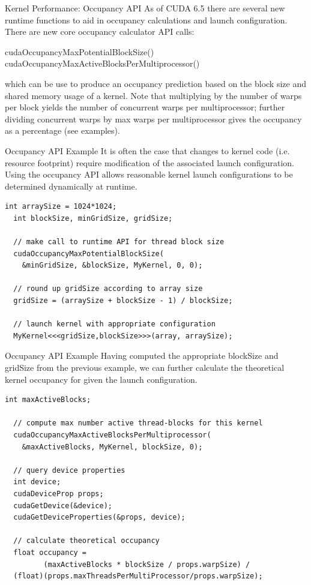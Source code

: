 \documentclass[handout]{beamer}
\begin{document}
\begin{frame}{Kernel Performance: Occupancy API}
As of CUDA 6.5 there are several new runtime functions to aid in occupancy calculations and launch configuration.  There are new core occupancy calculator API calls: \begin{center}
{\selectfont cudaOccupancyMaxPotentialBlockSize()}\break
{\selectfont cudaOccupancyMaxActiveBlocksPerMultiprocessor()}
\end{center}
which can be use to produce an occupancy prediction based on the block size and shared memory usage of a kernel.  
\newline\newline
Note that multiplying by the number of warps per block yields the number of concurrent warps per multiprocessor; further dividing concurrent warps by max warps per multiprocessor gives the occupancy as a percentage (see examples).
\end{frame}

\begin{frame}[fragile]{Occupancy API Example}
It is often the case that changes to kernel code (i.e. resource footprint) require modification of the associated launch configuration.  Using the occupancy API allows reasonable kernel launch configurations to be determined dynamically at runtime.  
\begin{lstlisting}[caption={Use CUDA runtime API to determine kernel lunch configuration}] 
  int arraySize = 1024*1024;
  int blockSize, minGridSize, gridSize;

  // make call to runtime API for thread block size 
  cudaOccupancyMaxPotentialBlockSize(
    &minGridSize, &blockSize, MyKernel, 0, 0);

  // round up gridSize according to array size
  gridSize = (arraySize + blockSize - 1) / blockSize;

  // launch kernel with appropriate configuration
  MyKernel<<<gridSize,blockSize>>>(array, arraySize);
\end{lstlisting}
\end{frame}


\begin{frame}[fragile]{Occupancy API Example}
Having computed the appropriate blockSize and gridSize from the previous example, we can further calculate the theoretical kernel occupancy for given the launch configuration.
\begin{lstlisting}[caption={Use CUDA runtime API to calculate kernel occupancy}] 
  int maxActiveBlocks;
  
  // compute max number active thread-blocks for this kernel
  cudaOccupancyMaxActiveBlocksPerMultiprocessor( 
    &maxActiveBlocks, MyKernel, blockSize, 0);
  
  // query device properties
  int device;
  cudaDeviceProp props;
  cudaGetDevice(&device);
  cudaGetDeviceProperties(&props, device);

  // calculate theoretical occupancy
  float occupancy = 
         (maxActiveBlocks * blockSize / props.warpSize) / 
  (float)(props.maxThreadsPerMultiProcessor/props.warpSize);
\end{lstlisting}
\end{frame}
\end{document}
